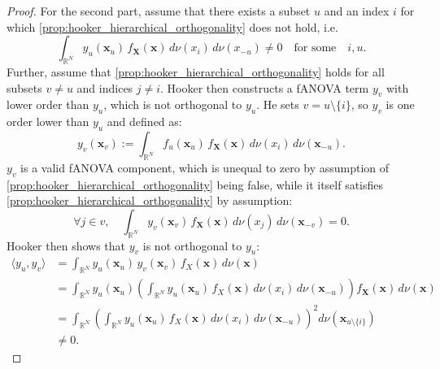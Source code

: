 \begin{proof}
For the second part, assume that there exists a subset $u$ and an index $i$ for which \autoref{prop:hooker_hierarchical_orthogonality} does not hold, i.e.
    \begin{equation}
        \int_{\mathbb{R}^N} y_u(\boldsymbol{x}_u)\, f_{\boldsymbol{X}}(\boldsymbol{x})\, d \nu (x_i)\, d \nu (x_{-u}) \ne 0 \quad \text{for some} \quad i, u.
    \end{equation}
    Further, assume that \autoref{prop:hooker_hierarchical_orthogonality} holds for all subsets $v \neq u$ and indices $j \neq i$. Hooker then constructs a fANOVA term $y_v$ with lower order than $y_u$, which is not orthogonal to $y_u$. He sets $v = u \setminus \{i\}$, so $y_v$ is one order lower than $y_u$ and defined as:
    \begin{equation}
        y_v(\boldsymbol{x}_v) := \int_{\mathbb{R}^N} f_u(\boldsymbol{x}_u) \, f_{\boldsymbol{X}}(\boldsymbol{x}) \, d \nu (x_i) \, d \nu (\boldsymbol{x}_{-u}).
    \end{equation}
    $y_v$ is a valid fANOVA component, which is unequal to zero by assumption of \autoref{prop:hooker_hierarchical_orthogonality} being false, while it itself satisfies \autoref{prop:hooker_hierarchical_orthogonality} by assumption:
    \begin{equation}
        \forall j \in v, \quad \int_{\mathbb{R}^N} y_v(\boldsymbol{x}_v) \, f_{\boldsymbol{X}}(\boldsymbol{x}) \, d \nu (x_j) \, d \nu (\boldsymbol{x}_{-v}) = 0.
    \end{equation}
 Hooker then shows that $y_v$ is not orthogonal to $y_u$:
\begin{equation}
    \begin{aligned}
        \langle y_u, y_v \rangle
        &= \int_{\mathbb{R}^N} y_u(\boldsymbol{x}_u) \, y_v(\boldsymbol{x}_v) \, f_X(\boldsymbol{x}) \, d \nu(\boldsymbol{x}) \\
        &= \int_{\mathbb{R}^N} y_u(\boldsymbol{x}_u) \left( \int_{\mathbb{R}^N} y_u(\boldsymbol{x}_u) \, f_X(\boldsymbol{x}) \, d \nu(x_i) \, d \nu(\boldsymbol{x}_{-u}) \right) f_{\boldsymbol{X}}(\boldsymbol{x}) \, d \nu(\boldsymbol{x}) \\
        &= \int_{\mathbb{R}^N} \left( \int_{\mathbb{R}^N} y_u(\boldsymbol{x}_u) \, f_X(\boldsymbol{x}) \, d \nu(x_i) \, d \nu(\boldsymbol{x}_{-u}) \right)^2 d \nu(\boldsymbol{x}_{u \setminus \{i\}}) \\
        &\neq 0.
    \end{aligned}
\end{equation}

\end{proof}


